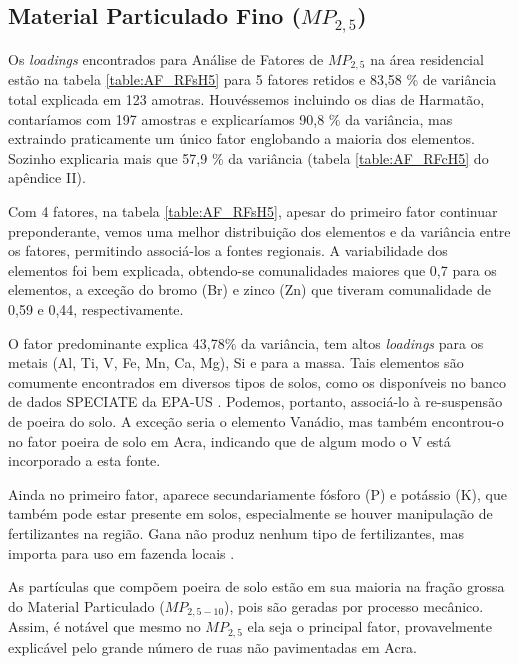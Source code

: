 \subsection{Material Particulado Fino ($MP_{2,5}$) \label{sec:pm2.5}}

Os \textit{loadings} encontrados para Análise de Fatores de $MP_{2,5}$
na área residencial estão na tabela \ref{table:AF_RFsH5} para 5 fatores retidos
e 83,58 \% de variância total explicada em 123 amotras. 
Houvéssemos incluindo os dias de Harmatão, contaríamos com 197 amostras e 
explicaríamos 90,8 \% da variância, mas extraindo praticamente um único fator 
englobando a maioria dos elementos. Sozinho explicaria mais que 57,9 \% da 
variância (tabela \ref{table:AF_RFcH5} do apêndice II).

Com 4 fatores, na tabela \ref{table:AF_RFsH5}, apesar do primeiro fator 
continuar preponderante, vemos uma melhor distribuição dos elementos e da 
variância entre os fatores, permitindo associá-los a fontes regionais.
A variabilidade dos elementos foi bem explicada, obtendo-se comunalidades 
maiores que 0,7 para os elementos, a exceção do bromo (Br) e zinco (Zn) que 
tiveram comunalidade de 0,59 e 0,44, respectivamente.

O fator predominante explica 43,78\% da variância, tem altos \textit{loadings} 
para os metais (Al, Ti, V, Fe, Mn, Ca, Mg), Si e para a massa. Tais elementos 
são comumente encontrados em diversos tipos de solos, como os disponíveis no 
banco de dados SPECIATE da EPA-US \citep{simon2010}. Podemos, portanto, 
associá-lo à re-suspensão de poeira do solo. A exceção seria o elemento Vanádio,
mas \citet{aboh2009} também encontrou-o no fator poeira de solo em Acra, 
indicando que de algum modo o V está incorporado a esta fonte.

Ainda no primeiro fator, aparece secundariamente fósforo (P) e potássio (K), 
que também pode estar presente em solos, especialmente se houver manipulação 
de fertilizantes na região. Gana não produz nenhum tipo de fertilizantes,
mas importa para uso em fazenda locais \citep{fianko2011}. 

As partículas que compõem poeira de solo estão em sua maioria na fração
grossa do Material Particulado ($MP_{2,5-10}$), pois são geradas por processo 
mecânico. Assim, é notável que mesmo no $MP_{2,5}$ ela seja o principal fator, 
provavelmente explicável pelo grande número de ruas não pavimentadas em Acra. 


